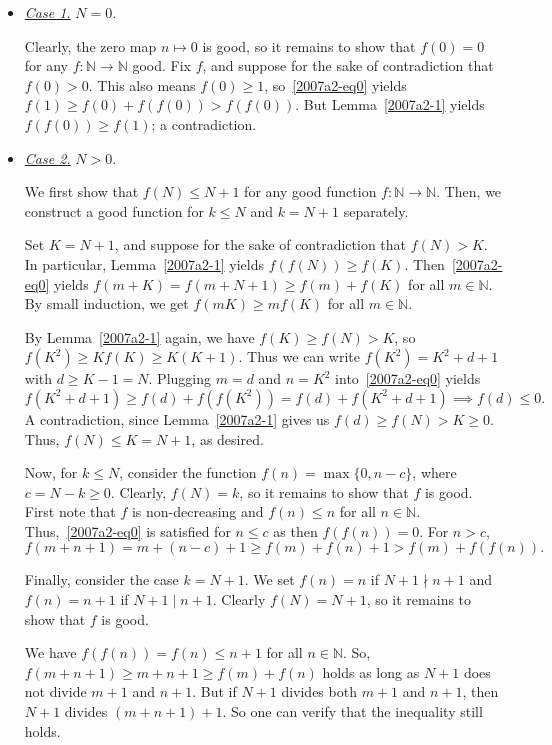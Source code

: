 \documentclass{article}
\newcommand{\N}{\mathbb{N}}
\begin{document}
\begin{itemize}

    \item
    \textit{\underline{Case 1.}}
    $N = 0$.

    Clearly, the zero map $n \mapsto 0$ is good, so it remains to show that $f(0) = 0$ for any $f : \N \to \N$ good.
    Fix $f$, and suppose for the sake of contradiction that $f(0) > 0$.
    This also means $f(0) \geq 1$, so~\eqref{2007a2-eq0} yields $f(1) \geq f(0) + f(f(0)) > f(f(0))$.
    But Lemma~\ref{2007a2-1} yields $f(f(0)) \geq f(1)$; a contradiction.

    \item
    \textit{\underline{Case 2.}}
    $N > 0$.

    We first show that $f(N) \leq N + 1$ for any good function $f : \N \to \N$.
    Then, we construct a good function for $k \leq N$ and $k = N + 1$ separately.

    Set $K = N + 1$, and suppose for the sake of contradiction that $f(N) > K$.
    In particular, Lemma~\ref{2007a2-1} yields $f(f(N)) \geq f(K)$.
    Then~\eqref{2007a2-eq0} yields $f(m + K) = f(m + N + 1) \geq f(m) + f(K)$ for all $m \in \N$.
    By small induction, we get $f(mK) \geq m f(K)$ for all $m \in \N$.

    By Lemma~\ref{2007a2-1} again, we have $f(K) \geq f(N) > K$, so $f(K^2) \geq K f(K) \geq K (K + 1)$.
    Thus we can write $f(K^2) = K^2 + d + 1$ with $d \geq K - 1 = N$.
    Plugging $m = d$ and $n = K^2$ into~\eqref{2007a2-eq0} yields
    \[ f(K^2 + d + 1) \geq f(d) + f(f(K^2)) = f(d) + f(K^2 + d + 1) \implies f(d) \leq 0. \]
    A contradiction, since Lemma~\ref{2007a2-1} gives us $f(d) \geq f(N) > K \geq 0$.
    Thus, $f(N) \leq K = N + 1$, as desired.

    Now, for $k \leq N$, consider the function $f(n) = \max\{0, n - c\}$, where $c = N - k \geq 0$.
    Clearly, $f(N) = k$, so it remains to show that $f$ is good.
    First note that $f$ is non-decreasing and $f(n) \leq n$ for all $n \in \N$.
    Thus,~\eqref{2007a2-eq0} is satisfied for $n \leq c$ as then $f(f(n)) = 0$.
    For $n > c$,
    \[ f(m + n + 1) = m + (n - c) + 1 \geq f(m) + f(n) + 1 > f(m) + f(f(n)). \]

    Finally, consider the case $k = N + 1$.
    We set $f(n) = n$ if $N + 1 \nmid n + 1$ and $f(n) = n + 1$ if $N + 1 \mid n + 1$.
    Clearly $f(N) = N + 1$, so it remains to show that $f$ is good.
    
    We have $f(f(n)) = f(n) \leq n + 1$ for all $n \in \N$.
    So, $f(m + n + 1) \geq m + n + 1 \geq f(m) + f(n)$ holds as long as $N + 1$ does not divide $m + 1$ and $n + 1$.
    But if $N + 1$ divides both $m + 1$ and $n + 1$, then $N + 1$ divides $(m + n + 1) + 1$.
    So one can verify that the inequality still holds.

\end{itemize}
\end{document}
